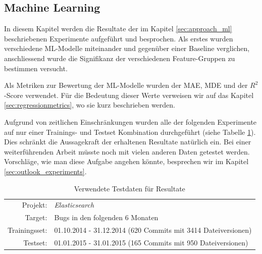 \documentclass[10pt, a4paper]{article}
\begin{document}
\subsection{Machine Learning} \label{sec:ml_results}

In diesem Kapitel werden die Resultate der im Kapitel \ref{sec:approach_ml} beschriebenen Experimente aufgeführt und besprochen. Als erstes wurden verschiedene \ac{ML}-Modelle miteinander und gegenüber einer Baseline verglichen, anschliessend wurde die Signifikanz der verschiedenen Feature-Gruppen zu bestimmen versucht.

Als Metriken zur Bewertung der \ac{ML}-Modelle wurden der \acf{MAE}, \acf{MDE} und der \(R^2\)-Score verwendet. Für die Bedeutung dieser Werte verweisen wir auf das Kapitel \ref{sec:regressionmetrics}, wo sie kurz beschrieben werden.

Aufgrund von zeitlichen Einschränkungen wurden alle der folgenden Experimente auf nur einer Trainings- und Testset Kombination durchgeführt (siehe Tabelle \ref{tab:testdata_for_results}). Dies schränkt die Aussagekraft der erhaltenen Resultate natürlich ein. Bei einer weiterführenden Arbeit müsste noch mit vielen anderen Daten getestet werden. Vorschläge, wie man diese Aufgabe angehen könnte, besprechen wir im Kapitel \ref{sec:outlook_experiments}.

\begin{table}[ht]
	\begin{tabular}[c]{rl}
		\hline
		Projekt:		&	\emph{Elasticsearch} \\
		Target:			&	Bugs in den folgenden 6 Monaten \\
		Trainingsset: 	&	01.10.2014 - 31.12.2014 (620 Commits mit 3414 Dateiversionen) \\
		Testset:		&	01.01.2015 - 31.01.2015 (165 Commits mit 950 Dateiversionen) \\
		\hline
	\end{tabular}
	\centering
	\caption{Verwendete Testdaten für Resultate}
	\label{tab:testdata_for_results}
\end{table}
\end{document}
